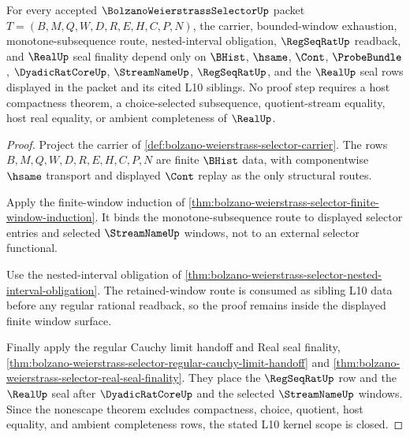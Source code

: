 \begin{theorem}
\label{thm:bolzano-weierstrass-selector-scope-closure}
For every accepted $\BolzanoWeierstrassSelectorUp$ packet $T=(B,M,Q,W,D,R,E,H,C,P,N)$, the carrier, bounded-window exhaustion, monotone-subsequence route, nested-interval obligation, $\RegSeqRatUp$ readback, and $\RealUp$ seal finality depend only on $\BHist$, $\hsame$, $\Cont$, $\ProbeBundle$, $\DyadicRatCoreUp$, $\StreamNameUp$, $\RegSeqRatUp$, and the $\RealUp$ seal rows displayed in the packet and its cited L10 siblings. No proof step requires a host compactness theorem, a choice-selected subsequence, quotient-stream equality, host real equality, or ambient completeness of $\RealUp$.
\end{theorem}
\begin{proof}
Project the carrier of \autoref{def:bolzano-weierstrass-selector-carrier}. The rows $B,M,Q,W,D,R,E,H,C,P,N$ are finite $\BHist$ data, with componentwise $\hsame$ transport and displayed $\Cont$ replay as the only structural routes.

Apply the finite-window induction of \autoref{thm:bolzano-weierstrass-selector-finite-window-induction}. It binds the monotone-subsequence route to displayed selector entries and selected $\StreamNameUp$ windows, not to an external selector functional.

Use the nested-interval obligation of \autoref{thm:bolzano-weierstrass-selector-nested-interval-obligation}. The retained-window route is consumed as sibling L10 data before any regular rational readback, so the proof remains inside the displayed finite window surface.

Finally apply the regular Cauchy limit handoff and Real seal finality, \autoref{thm:bolzano-weierstrass-selector-regular-cauchy-limit-handoff} and \autoref{thm:bolzano-weierstrass-selector-real-seal-finality}. They place the $\RegSeqRatUp$ row and the $\RealUp$ seal after $\DyadicRatCoreUp$ and the selected $\StreamNameUp$ windows. Since the nonescape theorem excludes compactness, choice, quotient, host equality, and ambient completeness rows, the stated L10 kernel scope is closed.
\end{proof}

